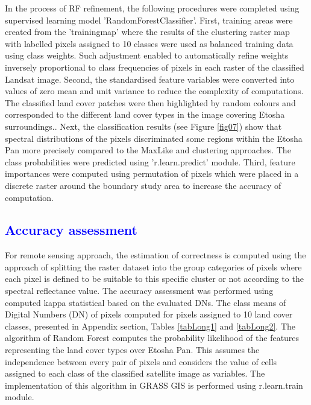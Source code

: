 \documentclass[climate,article,submit,pdftex,moreauthors]{Definitions/mdpi}
\begin{document}
In the process of RF refinement, the following procedures were completed using supervised learning model 'RandomForestClassifier'. First, training areas were created from the 'trainingmap' where the results of the clustering raster map with labelled pixels assigned to 10 classes were used as balanced training data using class weights. Such adjustment enabled to automatically refine weights inversely proportional to class frequencies of pixels in each raster of the classified Landsat image. Second, the standardised feature variables were converted into values of zero mean and unit variance to reduce the complexity of computations. {The classified land cover patches were then highlighted by random colours and corresponded to the different land cover types in the image covering Etosha surroundings.}. Next, the classification results (see Figure \ref{fig07}) show that spectral distributions of the pixels discriminated some regions within the Etosha Pan more precisely compared to the MaxLike and clustering approaches. The class probabilities were predicted using 'r.learn.predict' module. Third, feature importances were computed using permutation of pixels which were placed in a discrete raster around the boundary study area  to increase the accuracy of computation. 

\subsection{\textcolor{blue}{Accuracy assessment}}

{For remote sensing approach, the estimation of correctness is computed using the approach of splitting the raster dataset into the group categories of pixels where each pixel is defined to be suitable to this specific cluster or not according to the spectral reflectance value. The accuracy assessment was performed using computed kappa statistical based on the evaluated DNs.
The class means of Digital Numbers (DN) of pixels computed for pixels assigned to 10 land cover classes, presented in Appendix section, Tables} \ref{tabLong1} and \ref{tabLong2}. {The algorithm of Random Forest computes the probability likelihood of the features representing the land cover types over Etosha Pan. This assumes the independence between every pair of pixels and considers the value of cells assigned to each class of the classified satellite image as variables. The implementation of this algorithm in GRASS GIS is performed using r.learn.train module. }
\end{document}
